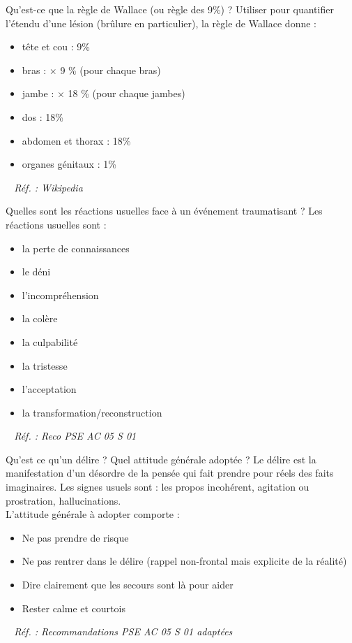 \documentclass[grid,avery5371,landscape]{flashcards}
\makeatletter
\newcounter{nocarte}
\newcommand{\categ}[1]{%
  \def\@categ{#1}%
  \setcounter{nocarte}{0}%
}
\newcommand{\source}[1]{%
  \medskip
  \itshape%
   ~ \hfill Réf. : #1}
\makeatother
\begin{document}
\color[HTML]{003273}
\categ{PSE}
\begin{flashcard}[bilan]{
 Qu'est-ce que la règle de Wallace (ou règle des 9\%) ?   }
  Utiliser pour quantifier l'étendu d'une lésion (brûlure en particulier), la règle de Wallace donne :
   \begin{itemize}
       \item tête et cou : 9\%
       \item bras : $\times$ 9 \% (pour chaque bras)
       \item jambe : $\times$ 18 \% (pour chaque jambes)
       \item dos : 18\%
       \item abdomen et thorax : 18\%
       \item organes génitaux : 1\%
   \end{itemize}
  \source{Wikipedia}
\end{flashcard}


\color[HTML]{003273}
\categ{PSE}
\begin{flashcard}[bilan]{
 Quelles sont les réactions usuelles face à un événement traumatisant ?   }
  Les réactions usuelles sont :
   \begin{itemize}
       \item la perte de connaissances
       \item le déni
       \item l'incompréhension
       \item la colère
       \item la culpabilité
       \item la tristesse
       \item l'acceptation
       \item la transformation/reconstruction
   \end{itemize}

  \source{Reco PSE AC 05 S 01}
\end{flashcard}


\color[HTML]{003273}
\categ{PSE}
\begin{flashcard}[bilan]{
 Qu'est ce qu'un délire ? Quel attitude générale adoptée ?   }
  Le délire est la manifestation d'un désordre de la pensée qui fait prendre pour réels des faits imaginaires. Les signes usuels sont : les propos incohérent, agitation ou prostration, hallucinations. \\
   L'attitude générale à adopter comporte : 
   \begin{itemize}
       \item Ne pas prendre de risque
       \item Ne pas rentrer dans le délire (rappel non-frontal mais explicite de la réalité)
       \item Dire clairement que les secours sont là pour aider
       \item Rester calme et courtois
    \end{itemize}
  \source{Recommandations PSE AC 05 S 01 adaptées}
\end{flashcard}
\end{document}

